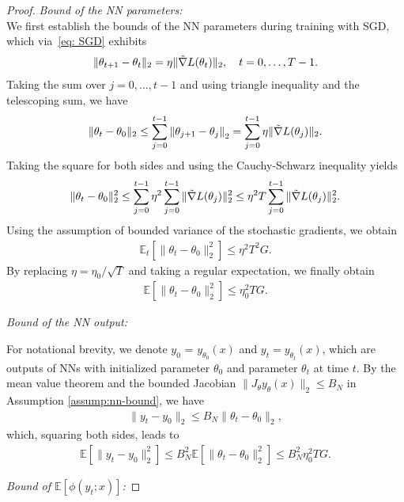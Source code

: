 \documentclass{article}
\def\E{\mathbb{E}}
\def\tgrad{\Tilde{\nabla}}
\def\x{x}
\def\y{y_{\theta}}   \def\hy{\hat{y}_{\theta}}    \def\ty{\Tilde{y}}
\begin{document}
\begin{proof}
\textit{Bound of the NN parameters:} \\
We first establish the bounds of the NN parameters during training with SGD, which via~\eqref{eq: SGD} exhibits
\begin{align*}
    \| \theta_{t+1} - \theta_t \|_2 = \eta \| \tgrad L (\theta_t) \|_2, \quad t =0, \dots, T-1.
\end{align*}
Taking the sum over $j=0, \dots, t-1$ and using triangle inequality and the telescoping sum, we have 
\begin{align*}
     \| \theta_t - \theta_0 \|_2 \leq \sum_{j=0}^{t-1} \left\| \theta_{j+1} - \theta_j\right\|_2 = \sum_{j=0}^{t-1} \eta \| \tgrad L (\theta_j) \|_2.
\end{align*}
Taking the square for both sides and using the Cauchy-Schwarz inequality yields
\begin{align*}
    \| \theta_t - \theta_0 \|^2_2 \leq \sum_{j=0}^{t-1} \eta^2  \sum_{j=0}^{t-1} \| \tgrad L (\theta_j) \|^2_2 \leq \eta^2 T \sum_{j=0}^{t-1} \| \tgrad L (\theta_j)  \|^2_2.
\end{align*}
Using the assumption of bounded variance of the stochastic gradients, we obtain
\begin{align*}
    \E_t [\| \theta_t - \theta_0 \|^2_2] \leq \eta^2 T^2 G.
\end{align*}
By replacing $\eta = \eta_0/\sqrt{T}$ and taking a regular expectation, we finally obtain 
\begin{align}\label{eq: para bound}
    \E [\| \theta_t - \theta_0 \|^2_2] \leq \eta_0^2 T G.
\end{align}

\textit{Bound of the NN output:}

For notational brevity, we denote $y_0$ = $y_{\theta_0} (x)$ and $y_t = y_{\theta_t} (x)$, which are outputs of NNs with initialized parameter $\theta_0$ and parameter $\theta_t$ at time $t$.
By the mean value theorem and the bounded Jacobian $\|J_\theta \y(\x) \|_2 \leq B_N$ in Assumption \ref{assump:nn-bound}, we have 
\begin{align*}
    \|y_t - y_0 \|_2 \leq B_N \| \theta_t - \theta_0 \|_2,
\end{align*}
which, squaring both sides, leads to 
\begin{align}\label{eq: output bound}
    \E[ \|y_t - y_0 \|^2_2] \leq B_N^2 \E [\| \theta_t - \theta_0 \|^2_2] \leq B_N^2 \eta_0^2 TG.
\end{align}

\textit{Bound of $\E[\phi(y_t;\x)]$:}


\end{proof}
\end{document}

